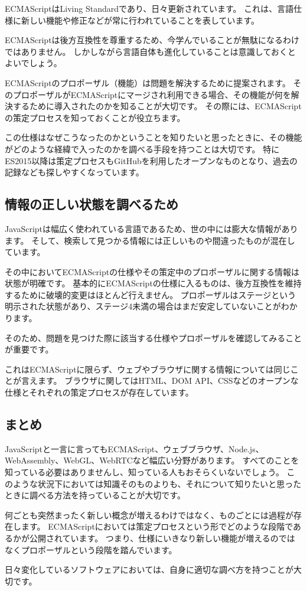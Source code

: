 ECMAScriptはLiving Standardであり、日々更新されています。
これは、言語仕様に新しい機能や修正などが常に行われていることを表しています。

ECMAScriptは後方互換性を尊重するため、今学んでいることが無駄になるわけではありません。
しかしながら言語自体も進化していることは意識しておくとよいでしょう。

ECMAScriptのプロポーザル（機能）は問題を解決するために提案されます。
そのプロポーザルがECMAScriptにマージされ利用できる場合、その機能が何を解決するために導入されたのかを知ることが大切です。
その際には、ECMAScriptの策定プロセスを知っておくことが役立ちます。

この仕様はなぜこうなったのかということを知りたいと思ったときに、その機能がどのような経緯で入ったのかを調べる手段を持つことは大切です。
特にES2015以降は策定プロセスもGitHubを利用したオープンなものとなり、過去の記録なども探しやすくなっています。

\hypertarget{to-search}{%
\subsection{情報の正しい状態を調べるため}\label{to-search}}

JavaScriptは幅広く使われている言語であるため、世の中には膨大な情報があります。
そして、検索して見つかる情報には正しいものや間違ったものが混在しています。

その中においてECMAScriptの仕様やその策定中のプロポーザルに関する情報は状態が明確です。
基本的にECMAScriptの仕様に入るものは、後方互換性を維持するために破壊的変更はほとんど行えません。
プロポーザルはステージという明示された状態があり、ステージ4未満の場合はまだ安定していないことがわかります。

そのため、問題を見つけた際に該当する仕様やプロポーザルを確認してみることが重要です。

これはECMAScriptに限らず、ウェブやブラウザに関する情報については同じことが言えます。
ブラウザに関してはHTML、DOM
API、CSSなどのオープンな仕様とそれぞれの策定プロセスが存在しています。

\hypertarget{ecmascript-summary}{%
\subsection{まとめ}\label{ecmascript-summary}}

JavaScriptと一言に言ってもECMAScript、ウェブブラウザ、Node.js、WebAssembly、WebGL、WebRTCなど幅広い分野があります。
すべてのことを知っている必要はありませんし、知っている人もおそらくいないでしょう。
このような状況下においては知識そのものよりも、それについて知りたいと思ったときに調べる方法を持っていることが大切です。

何ごとも突然まったく新しい概念が増えるわけではなく、ものごとには過程が存在します。
ECMAScriptにおいては策定プロセスという形でどのような段階であるかが公開されています。
つまり、仕様にいきなり新しい機能が増えるのではなくプロポーザルという段階を踏んでいます。

日々変化しているソフトウェアにおいては、自身に適切な調べ方を持つことが大切です。
